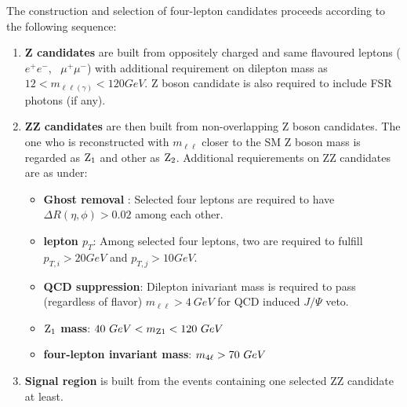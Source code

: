 The construction and selection of four-lepton candidates proceeds
according to the following sequence:
\begin{enumerate}
	\item {\bf Z candidates} are built from oppositely charged and same flavoured leptons ($e^+ e^-$, \, $\mu^+\mu^-$) with additional requirement on dilepton mass as $12 < m_{\ell\ell(\gamma)} < 120 GeV$. %
Z boson candidate is also required to include FSR photons (if any).
\item {\bf ZZ candidates} are then built from non-overlapping Z boson candidates. The one who is reconstructed with $m_{\ell\ell}$ closer to the SM Z boson mass is regarded as ${\rm Z_1}$ and other as ${\rm Z_2}$. Additional requierements on ZZ candidates are as under: 
  \begin{itemize}
  \item {\bf Ghost removal }: Selected four leptons are required to have $\Delta R(\eta,\phi) > 0.02$ among each other.
  \item {\bf lepton $p_T$}: Among selected four leptons, two are required to fulfill
     $p_{T,i} > 20 GeV$ and $p_{T,j} > 10 GeV$.
  \item {\bf QCD suppression}: Dilepton inivariant mass is required to pass (regardless of flavor) $m_{\ell\ell} > 4~ GeV$ for QCD induced  $J/\Psi$ veto.
  \item {\bf ${\rm Z_1}$ mass}: $40~GeV < m_{\rm Z1} <120~GeV$
  \item {\bf four-lepton invariant mass}: $m_{4\ell} > 70~ GeV $
  \end{itemize}
\item {\bf Signal region} is built from the events containing one selected ZZ candidate at least.%
\end{enumerate}


